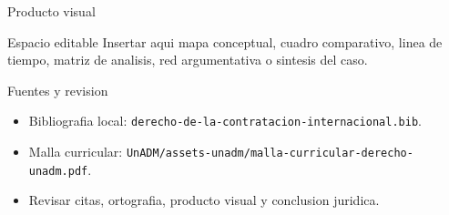 \documentclass[
  spanish,
  aspectratio=169,
  xcolor={dvipsnames,table}
]{beamer}
\begin{document}
\begin{frame}{Producto visual}
  \begin{block}{Espacio editable}
    Insertar aqui mapa conceptual, cuadro comparativo, linea de tiempo,
    matriz de analisis, red argumentativa o sintesis del caso.
  \end{block}
  \centering
\end{frame}

\begin{frame}{Fuentes y revision}
  \begin{itemize}
    \item Bibliografia local: \texttt{derecho-de-la-contratacion-internacional.bib}.
    \item Malla curricular: \texttt{UnADM/assets-unadm/malla-curricular-derecho-unadm.pdf}.
    \item Revisar citas, ortografia, producto visual y conclusion juridica.
  \end{itemize}
\end{frame}
\end{document}
